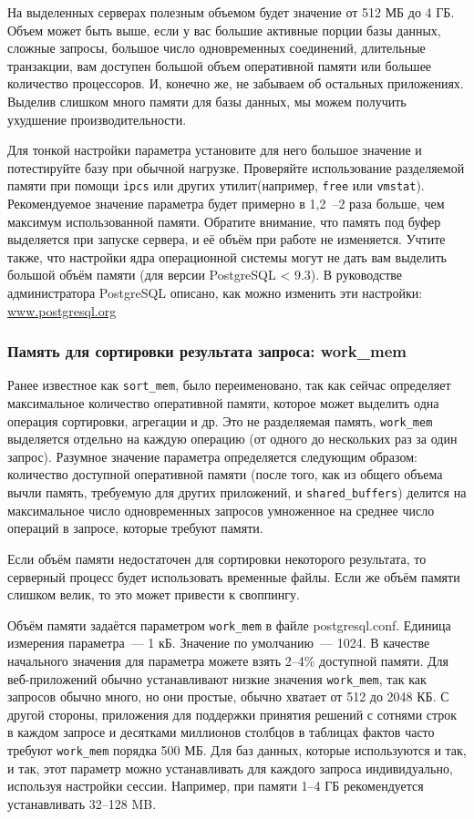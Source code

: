 На выделенных серверах полезным объемом будет значение от 512 МБ до 4 ГБ. Объем может быть выше, если у вас большие активные порции базы данных, сложные запросы, большое число одновременных соединений, длительные транзакции, вам доступен большой объем оперативной памяти или большее количество процессоров. И, конечно же, не забываем об остальных приложениях. Выделив слишком много памяти для базы данных, мы можем получить ухудшение производительности.

Для тонкой настройки параметра установите для него большое значение и потестируйте базу при обычной нагрузке. Проверяйте использование разделяемой памяти при помощи \lstinline!ipcs! или других утилит(например, \lstinline!free! или \lstinline!vmstat!). Рекомендуемое значение параметра будет примерно в 1,2~--2 раза больше, чем максимум использованной памяти. Обратите внимание, что память под буфер выделяется при запуске сервера, и её объём при работе не изменяется. Учтите также, что настройки ядра операционной системы могут не дать вам выделить большой объём памяти (для версии PostgreSQL < 9.3). В руководстве администратора PostgreSQL описано, как можно изменить эти настройки: \href{http://www.postgresql.org/docs/devel/static/kernel-resources.html}{www.postgresql.org}


\subsubsection{Память для сортировки результата запроса: work\_mem}


Ранее известное как \lstinline!sort_mem!, было переименовано, так как сейчас определяет максимальное количество оперативной памяти, которое может выделить одна операция сортировки, агрегации и др. Это не разделяемая память, \lstinline!work_mem! выделяется отдельно на каждую операцию (от одного до нескольких раз за один запрос). Разумное значение параметра определяется следующим образом: количество доступной оперативной памяти (после того, как из общего объема вычли память, требуемую для других приложений, и \lstinline!shared_buffers!) делится на максимальное число одновременных запросов умноженное на среднее число операций в запросе, которые требуют памяти.

Если объём памяти недостаточен для сортировки некоторого результата, то серверный процесс будет использовать временные файлы. Если же объём памяти слишком велик, то это может привести к своппингу.

Объём памяти задаётся параметром \lstinline!work_mem! в файле postgresql.conf. Единица измерения параметра~--- 1 кБ. Значение по умолчанию~--- 1024. В качестве начального значения для параметра можете взять 2--4\% доступной памяти. Для веб-приложений обычно устанавливают низкие значения \lstinline!work_mem!, так как запросов обычно много, но они простые, обычно хватает от 512 до 2048 КБ. С другой стороны, приложения для поддержки принятия решений с сотнями строк в каждом запросе и десятками миллионов столбцов  в таблицах фактов часто требуют \lstinline!work_mem! порядка 500 МБ. Для баз данных, которые используются и так, и так, этот параметр можно устанавливать для каждого запроса индивидуально, используя настройки сессии. Например, при памяти 1--4 ГБ рекомендуется устанавливать 32--128 MB.


